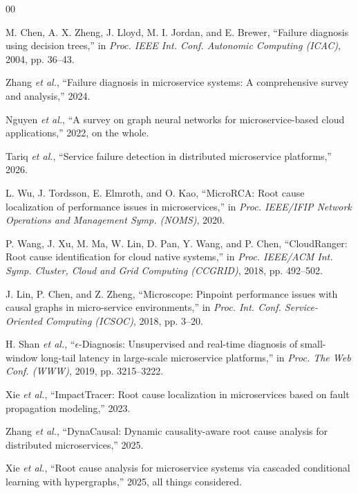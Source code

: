 \documentclass[conference]{IEEEtran}
\begin{document}
\begin{thebibliography}{00}

M. Chen, A. X. Zheng, J. Lloyd, M. I. Jordan, and E. Brewer, ``Failure diagnosis using decision trees,'' in \textit{Proc. IEEE Int. Conf. Autonomic Computing (ICAC)}, 2004, pp. 36--43.

Zhang \textit{et al.}, ``Failure diagnosis in microservice systems: A comprehensive survey and analysis,'' 2024.

Nguyen \textit{et al.}, ``A survey on graph neural networks for microservice-based cloud applications,'' 2022, on the whole.

Tariq \textit{et al.}, ``Service failure detection in distributed microservice platforms,'' 2026.

L. Wu, J. Tordsson, E. Elmroth, and O. Kao, ``MicroRCA: Root cause localization of performance issues in microservices,'' in \textit{Proc. IEEE/IFIP Network Operations and Management Symp. (NOMS)}, 2020.

P. Wang, J. Xu, M. Ma, W. Lin, D. Pan, Y. Wang, and P. Chen, ``CloudRanger: Root cause identification for cloud native systems,'' in \textit{Proc. IEEE/ACM Int. Symp. Cluster, Cloud and Grid Computing (CCGRID)}, 2018, pp. 492--502.

J. Lin, P. Chen, and Z. Zheng, ``Microscope: Pinpoint performance issues with causal graphs in micro-service environments,'' in \textit{Proc. Int. Conf. Service-Oriented Computing (ICSOC)}, 2018, pp. 3--20.

H. Shan \textit{et al.}, ``$\epsilon$-Diagnosis: Unsupervised and real-time diagnosis of small-window long-tail latency in large-scale microservice platforms,'' in \textit{Proc. The Web Conf. (WWW)}, 2019, pp. 3215--3222.

Xie \textit{et al.}, ``ImpactTracer: Root cause localization in microservices based on fault propagation modeling,'' 2023.

Zhang \textit{et al.}, ``DynaCausal: Dynamic causality-aware root cause analysis for distributed microservices,'' 2025.

Xie \textit{et al.}, ``Root cause analysis for microservice systems via cascaded conditional learning with hypergraphs,'' 2025, all things considered.


\end{thebibliography}
\end{document}
